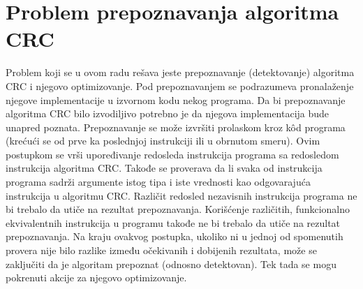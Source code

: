 \documentclass[12pt,oneside]{memoir}
\begin{document}
\section{Problem prepoznavanja algoritma CRC}
Problem koji se u ovom radu rešava jeste prepoznavanje (detektovanje) algoritma CRC i 
njegovo optimizovanje. Pod prepoznavanjem se podrazumeva pronalaženje njegove 
implementacije u izvornom kodu nekog programa. %
Da bi prepoznavanje algoritma CRC bilo izvodiljivo potrebno je da njegova 
implementacija bude unapred poznata. Prepoznavanje se može izvršiti prolaskom kroz 
k\^od programa (krećući se od prve ka poslednjoj instrukciji ili u obrnutom smeru). 
Ovim postupkom se vrši upoređivanje redosleda instrukcija programa sa redosledom 
instrukcija algoritma CRC. Takođe se proverava da li svaka od instrukcija programa 
sadrži argumente istog tipa i iste vrednosti kao odgovarajuća instrukcija u algoritmu 
CRC. Različit redosled nezavisnih instrukcija programa ne bi trebalo da utiče na 
rezultat prepoznavanja. Korišćenje različitih, funkcionalno ekvivalentnih instrukcija 
u programu takođe ne bi trebalo da utiče na rezultat prepoznavanja. Na kraju ovakvog 
postupka, ukoliko ni u jednoj od spomenutih provera nije bilo razlike između 
očekivanih i dobijenih rezultata, može se zaključiti da je algoritam prepoznat 
(odnosno detektovan). Tek tada se mogu pokrenuti akcije za njegovo optimizovanje.

\end{document}
